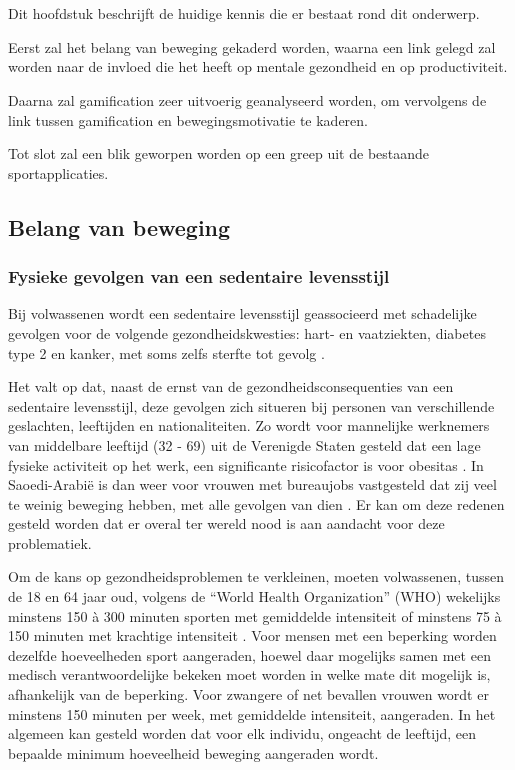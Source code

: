 \chapter{}%
\label{ch:stand-van-zaken}

Dit hoofdstuk beschrijft de huidige kennis die er bestaat rond dit onderwerp.

Eerst zal het belang van beweging gekaderd worden, waarna een link gelegd zal worden naar de invloed die het heeft op mentale gezondheid en op productiviteit.

Daarna zal gamification zeer uitvoerig geanalyseerd worden, om vervolgens de link tussen gamification en bewegingsmotivatie te kaderen.

Tot slot zal een blik geworpen worden op een greep uit de bestaande sportapplicaties.

\section{Belang van beweging}

\subsection{Fysieke gevolgen van een sedentaire levensstijl}
\label{ssec:fysieke-gevolgen}
Bij volwassenen wordt een sedentaire levensstijl geassocieerd met schadelijke gevolgen voor de volgende gezondheidskwesties: hart- en vaatziekten, diabetes type 2 en kanker, met soms zelfs sterfte tot gevolg \autocite{Bull2020}.

Het valt op dat, naast de ernst van de gezondheidsconsequenties van een sedentaire levensstijl, deze gevolgen zich situeren bij personen van verschillende geslachten, leeftijden en nationaliteiten. Zo wordt voor mannelijke werknemers van middelbare leeftijd (32 - 69) uit de Verenigde Staten gesteld dat een lage fysieke activiteit op het werk, een significante risicofactor is voor obesitas \autocite{Choi2010}. In Saoedi-Arabië is dan weer voor vrouwen met bureaujobs vastgesteld dat zij veel te weinig beweging hebben, met alle gevolgen van dien \autocite{Albawardi2017}. Er kan om deze redenen gesteld worden dat er overal ter wereld nood is aan aandacht voor deze problematiek.

Om de kans op gezondheidsproblemen te verkleinen, moeten volwassenen, tussen de 18 en 64 jaar oud, volgens de ``World Health Organization'' (WHO) wekelijks minstens 150 à 300 minuten sporten met gemiddelde intensiteit of minstens 75 à 150 minuten met krachtige intensiteit \autocite{Bull2020}. Voor mensen met een beperking worden dezelfde hoeveelheden sport aangeraden, hoewel daar mogelijks samen met een medisch verantwoordelijke bekeken moet worden in welke mate dit mogelijk is, afhankelijk van de beperking. Voor zwangere of net bevallen vrouwen wordt er minstens 150 minuten per week, met gemiddelde intensiteit, aangeraden. In het algemeen kan gesteld worden dat voor elk individu, ongeacht de leeftijd, een bepaalde minimum hoeveelheid beweging aangeraden wordt.

